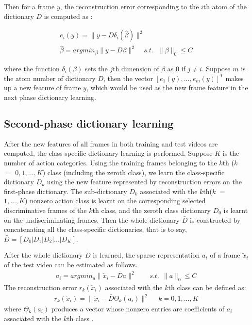 \documentclass{article}
\begin{document}
Then for a frame $y$, the reconstruction error corresponding to the $i$th atom of the dictionary $D$ is computed as \cite{Pati93orthogonalmatching}:


\begin{equation} \label{eq1}
 \begin{aligned}
e_{i}(y)=\|y-D\delta_{i}(\hat{\beta})\|^{2}      \  \ \ \ \  \  \ \ \ \   \ \ \    \\
\hat{\beta}=argmin_{\beta}\|y-D\beta\|^{2}   \  \ \ \ \ s.t. \ \ \ \|\beta\|_{0}\leq C
 \end{aligned}
\end{equation}




where the function $\delta_{i}(\beta)$  sets the $j$th dimension of $\beta$ as 0 if $j\neq i$.
Suppose $m$ is the atom number of dictionary $D$,
then the vector $[e_{1}(y),...,e_{m}(y)]^{T}$ makes up a new feature of frame $y$, which would be used as the new frame feature in the next phase dictionary learning.

\subsection{Second-phase dictionary learning}
After the new features of all frames in both training and test videos are computed, the class-specific dictionary learning \cite{Wang20123902} is performed.
Suppose $K$ is the number of action categories.
Using the training frames belonging to the $k$th ($k$ $=$ $0,1,...,K$) class (including the zeroth class), we learn the class-specific dictionary $D_{k}$ using the new feature represented by reconstruction errors on the first-phase dictionary.
The sub-dictionary $D_{k}$ associated with the $k$th($k$ $=$ $1,...,K$) nonzero action class is learnt on the corresponding selected discriminative frames of the $k$th class, and the zeroth class dictionary $D_{0}$ is learnt on the undiscriminating frames.
Then the whole dictionary $\bar{D}$ is constructed by concatenating all the class-specific dictionaries, that is to say, $\bar{D}=[D_{0}|D_{1}| D_{2} |...| D_{K}]$.


After the whole dictionary $\bar{D}$ is learned, the sparse representation $a_{i}$ of a  frame  $\check{x}_{i}$ of the test video can be estimated as follows.
\begin{equation} \label{eq5}
 \begin{aligned}
a_{i}=argmin_{a}    \|\check{x}_{i}-\bar{D}a\|^{2}   \ \ \ \ \ \ \ \ \  s.t.  \ \   \|a\|_{0} \leq C
 \end{aligned}
\end{equation}
The reconstruction error $r_{k}(\check{x}_{i})$ associated with the $k$th class can be defined as:
 \begin{equation} \label{eq5}
 \begin{aligned}
r_{k}(\check{x}_{i})=\|\check{x}_{i}-\bar{D}\Theta_{k}(a_{i})\|^{2}   \ \ \ \ \ \ k=0,1,...,K
 \end{aligned}
\end{equation}
where $\Theta_{k}(a_{i})$ produces a vector whose nonzero entries are coefficients of $a_{i}$  associated with the $k$th class .
\end{document}

